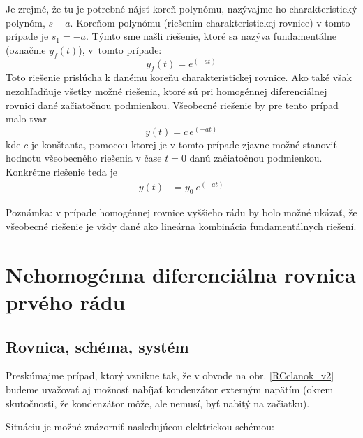 \documentclass[a4paper, 10pt, ]{article}
\begin{document}
Je zrejmé, že tu je potrebné nájsť koreň polynómu, nazývajme ho charakteristický polynóm, $s + a$. Koreňom polynómu (riešením charakteristickej rovnice) v tomto prípade je $s_1 = -a$. Týmto sme našli riešenie, ktoré sa nazýva fundamentálne (označme $y_f(t)$), v~tomto prípade:
\begin{equation}
    y_f(t) = e^{\left( - a t \right)} 
\end{equation}
Toto riešenie prislúcha k danému koreňu charakteristickej rovnice. Ako také však nezohľadňuje všetky možné riešenia, ktoré sú pri homogénnej diferenciálnej rovnici dané začiatočnou podmienkou. Všeobecné riešenie by pre tento prípad malo tvar
\begin{equation}
    y(t) = c\,e^{\left( - a t \right)} 
\end{equation}
kde $c$ je konštanta, pomocou ktorej je v tomto prípade zjavne možné stanoviť hodnotu všeobecného riešenia v čase $t=0$ danú začiatočnou podmienkou. Konkrétne riešenie teda je
\begin{align}
    y(t)   &=  y_0 \ e^{\left( - a t \right)}  
\end{align}

Poznámka: v prípade homogénnej rovnice vyššieho rádu by bolo možné ukázať, že všeobecné riešenie je vždy dané ako lineárna kombinácia fundamentálnych riešení.









\section{Nehomogénna diferenciálna rovnica prvého rádu}


\subsection{Rovnica, schéma, systém}

Preskúmajme prípad, ktorý vznikne tak, že v obvode na obr. \ref{RCclanok_v2} budeme uvažovať aj možnosť nabíjať kondenzátor externým napätím (okrem skutočnosti, že kondenzátor môže, ale nemusí, byť nabitý na začiatku).

Situáciu je možné znázorniť nasledujúcou elektrickou schémou:
\end{document}
